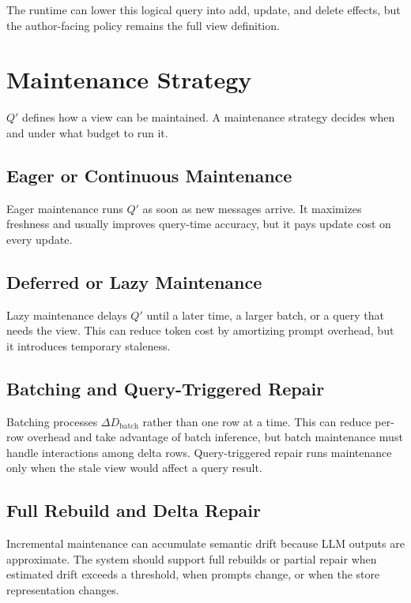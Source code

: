 \documentclass[11pt]{article}
\newcommand{\DQ}{Q'}
\newcommand{\DeltaDbatch}{\Delta D_{\mathrm{batch}}}
\begin{document}
The runtime can lower this logical query into add, update, and delete effects,
but the author-facing policy remains the full view definition.

\section{Maintenance Strategy}

\(\DQ\) defines how a view can be maintained. A maintenance strategy decides
when and under what budget to run it.

\subsection{Eager or Continuous Maintenance}

Eager maintenance runs \(\DQ\) as soon as new messages arrive. It maximizes
freshness and usually improves query-time accuracy, but it pays update cost on
every update.

\subsection{Deferred or Lazy Maintenance}

Lazy maintenance delays \(\DQ\) until a later time, a larger batch, or a query
that needs the view. This can reduce token cost by amortizing prompt overhead,
but it introduces temporary staleness.

\subsection{Batching and Query-Triggered Repair}

Batching processes \(\DeltaDbatch\) rather than one row at a time. This can
reduce per-row overhead and take advantage of batch inference, but batch
maintenance must handle interactions among delta rows. Query-triggered repair
runs maintenance only when the stale view would affect a query result.

\subsection{Full Rebuild and Delta Repair}

Incremental maintenance can accumulate semantic drift because LLM outputs are
approximate. The system should support full rebuilds or partial repair when
estimated drift exceeds a threshold, when prompts change, or when the store
representation changes.
\end{document}
